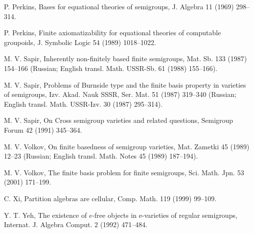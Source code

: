 \documentclass[preprint,1p,times]{elsarticle}
\numberwithin{equation}{section}
\theoremstyle{remark}
\begin{document}
\begin{thebibliography}{99}
P. Perkins, Bases for equational theories of semigroups, J. Algebra 11 (1969) 298--314.

P. Perkins, Finite axiomatizability for equational theories of computable groupoids, J. Symbolic Logic 54 (1989)
1018--1022.

M. V. Sapir, Inherently non-finitely based finite semigroups, Mat. Sb. 133 (1987) 154--166 (Russian; English transl.
Math. USSR-Sb. 61 (1988) 155--166).

M. V. Sapir, Problems of Burnside type and the finite basis property in varieties of semigroups, Izv. Akad. Nauk SSSR,
Ser. Mat. 51 (1987) 319--340 (Russian; English transl. Math. USSR-Izv. 30 (1987) 295--314).

M. V. Sapir, On Cross semigroup varieties and related questions, Semigroup Forum 42 (1991) 345--364.

M. V. Volkov, On finite basedness of semigroup varieties, Mat. Zametki 45 (1989) 12--23 (Russian; English transl. Math.
Notes 45 (1989) 187--194).

M. V. Volkov, The finite basis problem for finite semigroups, Sci. Math. Jpn. 53 (2001) 171--199.

C. Xi, Partition algebras are cellular, Comp. Math. 119 (1999) 99--109.

Y. T. Yeh, The existence of $e$-free objects in e-varieties of regular semigroups, Internat. J. Algebra Comput. 2
(1992) 471--484.

\end{thebibliography}
\end{document}
